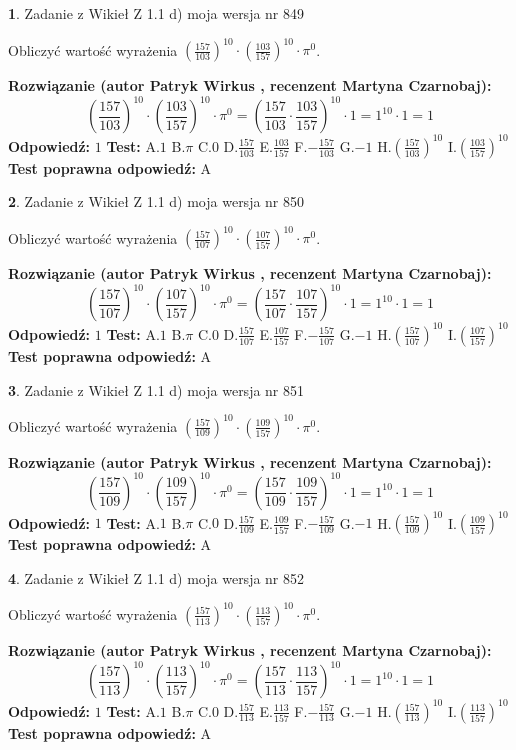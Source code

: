 \documentclass[12pt, a4paper]{article}
\theoremstyle{definition} %
\newtheorem{zad}{}
\newcommand{\zadStart}[1]{\begin{zad}#1\newline}
\newcommand{\zadStop}{\end{zad}}
\newcommand{\rozwStart}[2]{\noindent \textbf{Rozwiązanie (autor #1 , recenzent #2): }\newline}
\newcommand{\rozwStop}{\newline}
\newcommand{\odpStart}{\noindent \textbf{Odpowiedź:}\newline}
\newcommand{\odpStop}{\newline}
\newcommand{\testStart}{\noindent \textbf{Test:}\newline}
\newcommand{\testStop}{\newline}
\newcommand{\kluczStart}{\noindent \textbf{Test poprawna odpowiedź:}\newline}
\newcommand{\kluczStop}{\newline}
\begin{document}
\zadStart{Zadanie z Wikieł Z 1.1 d) moja wersja nr 849}

Obliczyć wartość wyrażenia $(\frac{157}{103})^{10} \cdot (\frac{103}{157})^{10} \cdot \pi^{0}$.
\zadStop
\rozwStart{Patryk Wirkus}{Martyna Czarnobaj}
$$(\frac{157}{103})^{10} \cdot (\frac{103}{157})^{10} \cdot \pi^{0} = (\frac{157}{103} \cdot \frac{103}{157})^{10} \cdot 1 = 1^{10} \cdot 1 = 1$$
\rozwStop
\odpStart
$1$
\odpStop
\testStart
A.$1$ B.$\pi$ C.$0$ D.$\frac{157}{103}$ E.$\frac{103}{157}$
F.$-\frac{157}{103}$ G.$-1$
H.$(\frac{157}{103})^{10}$
I.$(\frac{103}{157})^{10}$
\testStop
\kluczStart
A
\kluczStop



\zadStart{Zadanie z Wikieł Z 1.1 d) moja wersja nr 850}

Obliczyć wartość wyrażenia $(\frac{157}{107})^{10} \cdot (\frac{107}{157})^{10} \cdot \pi^{0}$.
\zadStop
\rozwStart{Patryk Wirkus}{Martyna Czarnobaj}
$$(\frac{157}{107})^{10} \cdot (\frac{107}{157})^{10} \cdot \pi^{0} = (\frac{157}{107} \cdot \frac{107}{157})^{10} \cdot 1 = 1^{10} \cdot 1 = 1$$
\rozwStop
\odpStart
$1$
\odpStop
\testStart
A.$1$ B.$\pi$ C.$0$ D.$\frac{157}{107}$ E.$\frac{107}{157}$
F.$-\frac{157}{107}$ G.$-1$
H.$(\frac{157}{107})^{10}$
I.$(\frac{107}{157})^{10}$
\testStop
\kluczStart
A
\kluczStop



\zadStart{Zadanie z Wikieł Z 1.1 d) moja wersja nr 851}

Obliczyć wartość wyrażenia $(\frac{157}{109})^{10} \cdot (\frac{109}{157})^{10} \cdot \pi^{0}$.
\zadStop
\rozwStart{Patryk Wirkus}{Martyna Czarnobaj}
$$(\frac{157}{109})^{10} \cdot (\frac{109}{157})^{10} \cdot \pi^{0} = (\frac{157}{109} \cdot \frac{109}{157})^{10} \cdot 1 = 1^{10} \cdot 1 = 1$$
\rozwStop
\odpStart
$1$
\odpStop
\testStart
A.$1$ B.$\pi$ C.$0$ D.$\frac{157}{109}$ E.$\frac{109}{157}$
F.$-\frac{157}{109}$ G.$-1$
H.$(\frac{157}{109})^{10}$
I.$(\frac{109}{157})^{10}$
\testStop
\kluczStart
A
\kluczStop



\zadStart{Zadanie z Wikieł Z 1.1 d) moja wersja nr 852}

Obliczyć wartość wyrażenia $(\frac{157}{113})^{10} \cdot (\frac{113}{157})^{10} \cdot \pi^{0}$.
\zadStop
\rozwStart{Patryk Wirkus}{Martyna Czarnobaj}
$$(\frac{157}{113})^{10} \cdot (\frac{113}{157})^{10} \cdot \pi^{0} = (\frac{157}{113} \cdot \frac{113}{157})^{10} \cdot 1 = 1^{10} \cdot 1 = 1$$
\rozwStop
\odpStart
$1$
\odpStop
\testStart
A.$1$ B.$\pi$ C.$0$ D.$\frac{157}{113}$ E.$\frac{113}{157}$
F.$-\frac{157}{113}$ G.$-1$
H.$(\frac{157}{113})^{10}$
I.$(\frac{113}{157})^{10}$
\testStop
\kluczStart
A
\kluczStop
\end{document}
